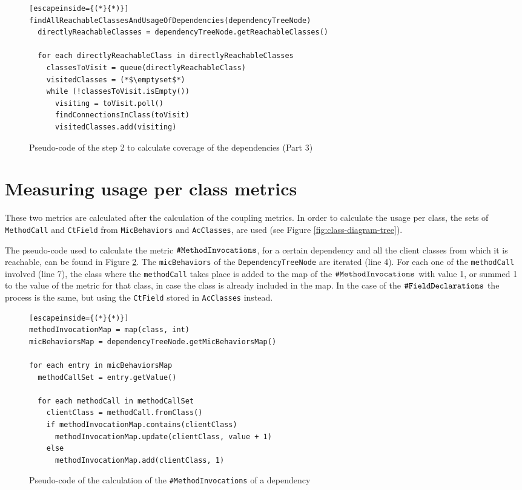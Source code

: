 \begin{figure}[ht!]
\begin{lstlisting}[escapeinside={(*}{*)}]
findAllReachableClassesAndUsageOfDependencies(dependencyTreeNode)
  directlyReachableClasses = dependencyTreeNode.getReachableClasses()

  for each directlyReachableClass in directlyReachableClasses
    classesToVisit = queue(directlyReachableClass)
    visitedClasses = (*$\emptyset$*)
    while (!classesToVisit.isEmpty())
      visiting = toVisit.poll()
      findConnectionsInClass(toVisit)
      visitedClasses.add(visiting)
\end{lstlisting}
\caption{Pseudo-code of the step 2 to calculate coverage of the dependencies (Part 3)}
\label{fig:algorithm-usage-step2-3}
\end{figure}

\section{Measuring usage per class metrics}
These two metrics are calculated after the calculation of the coupling metrics. In order to calculate the usage per class, the sets of \texttt{MethodCall} and \texttt{CtField} from \texttt{MicBehaviors} and \texttt{AcClasses}, are used (see Figure \ref{fig:class-diagram-tree}).

The pseudo-code used to calculate the metric $\verb|#MethodInvocations|$, for a certain dependency and all the client classes from which it is reachable, can be found in Figure \ref{fig:algorithm-method-invocations}. The \texttt{micBehaviors} of the \texttt{DependencyTreeNode} are iterated (line 4). For each one of the \texttt{methodCall} involved (line 7), the class where the \texttt{methodCall} takes place is added to the map of the $\verb|#MethodInvocations|$ with value 1, or summed 1 to the value of the metric for that class, in case the class is already included in the map. In the case of the $\verb|#FieldDeclarations|$ the process is the same, but using the \texttt{CtField} stored in \texttt{AcClasses} instead.

\begin{figure}[ht!]
\begin{lstlisting}[escapeinside={(*}{*)}]
methodInvocationMap = map(class, int)
micBehaviorsMap = dependencyTreeNode.getMicBehaviorsMap()

for each entry in micBehaviorsMap
  methodCallSet = entry.getValue()

  for each methodCall in methodCallSet
    clientClass = methodCall.fromClass()
    if methodInvocationMap.contains(clientClass)
      methodInvocationMap.update(clientClass, value + 1)
    else
      methodInvocationMap.add(clientClass, 1)
\end{lstlisting}
\caption{Pseudo-code of the calculation of the \texttt{\#MethodInvocations} of a dependency}
\label{fig:algorithm-method-invocations}
\end{figure}

